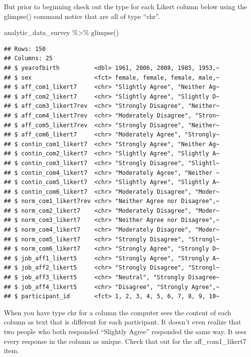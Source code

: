 \documentclass[
]{krantz}
\makeatletter
\newenvironment{Shaded}{\begin{snugshade}}{\end{snugshade}}
\newcommand{\FunctionTok}[1]{\textcolor[rgb]{0,0,0}{#1}}
\newcommand{\NormalTok}[1]{#1}
\newcommand{\SpecialCharTok}[1]{\textcolor[rgb]{0,0,0}{#1}}
\newenvironment{kframe}{%
\medskip{}
\setlength{\fboxsep}{.8em}
 \def\at@end@of@kframe{}%
 \ifinner\ifhmode%
  \def\at@end@of@kframe{\end{minipage}}%
  \begin{minipage}{\columnwidth}%
 \fi\fi%
 \def\FrameCommand##1{\hskip\@totalleftmargin \hskip-\fboxsep
 \colorbox{shadecolor}{##1}\hskip-\fboxsep
     \hskip-\linewidth \hskip-\@totalleftmargin \hskip\columnwidth}%
 \MakeFramed {\advance\hsize-\width
   \@totalleftmargin\z@ \linewidth\hsize
   \@setminipage}}%
 {\par\unskip\endMakeFramed%
 \at@end@of@kframe}
\renewenvironment{Shaded}{\begin{kframe}}{\end{kframe}}
\makeatother
\begin{document}
But prior to beginning check out the type for each Likert column below using the glimpse() command notice that are all of type ``chr''.

\begin{Shaded}
\begin{Highlighting}[]
\NormalTok{analytic\_data\_survey }\SpecialCharTok{\%\textgreater{}\%} \FunctionTok{glimpse}\NormalTok{()}
\end{Highlighting}
\end{Shaded}

\begin{verbatim}
## Rows: 150
## Columns: 25
## $ yearofbirth          <dbl> 1961, 2006, 2008, 1985, 1953,~
## $ sex                  <fct> female, female, female, male,~
## $ aff_com1_likert7     <chr> "Slightly Agree", "Neither Ag~
## $ aff_com2_likert7     <chr> "Slightly Agree", "Slightly D~
## $ aff_com3_likert7rev  <chr> "Strongly Disagree", "Neither~
## $ aff_com4_likert7rev  <chr> "Moderately Disagree", "Stron~
## $ aff_com5_likert7rev  <chr> "Strongly Disagree", "Neither~
## $ aff_com6_likert7     <chr> "Moderately Agree", "Strongly~
## $ contin_com1_likert7  <chr> "Strongly Agree", "Neither Ag~
## $ contin_com2_likert7  <chr> "Slightly Agree", "Slightly A~
## $ contin_com3_likert7  <chr> "Strongly Disagree", "Slightl~
## $ contin_com4_likert7  <chr> "Moderately Agree", "Neither ~
## $ contin_com5_likert7  <chr> "Slightly Agree", "Slightly A~
## $ contin_com6_likert7  <chr> "Moderately Disagree", "Moder~
## $ norm_com1_likert7rev <chr> "Neither Agree nor Disagree",~
## $ norm_com2_likert7    <chr> "Moderately Disagree", "Moder~
## $ norm_com3_likert7    <chr> "Neither Agree nor Disagree",~
## $ norm_com4_likert7    <chr> "Moderately Disagree", "Moder~
## $ norm_com5_likert7    <chr> "Strongly Disagree", "Strongl~
## $ norm_com6_likert7    <chr> "Strongly Agree", "Strongly D~
## $ job_aff1_likert5     <chr> "Strongly Agree", "Strongly A~
## $ job_aff2_likert5     <chr> "Strongly Disagree", "Strongl~
## $ job_aff3_likert5     <chr> "Neutral", "Strongly Disagree~
## $ job_aff4_likert5     <chr> "Disagree", "Strongly Agree",~
## $ participant_id       <fct> 1, 2, 3, 4, 5, 6, 7, 8, 9, 10~
\end{verbatim}

When you have type chr for a column the computer sees the content of each column as text that is different for each participant. It doesn't even realize that two people who both responded ``Slightly Agree'' responded the same way. It sees every response in the column as unique. Check that out for the aff\_com1\_likert7 item.
\end{document}
